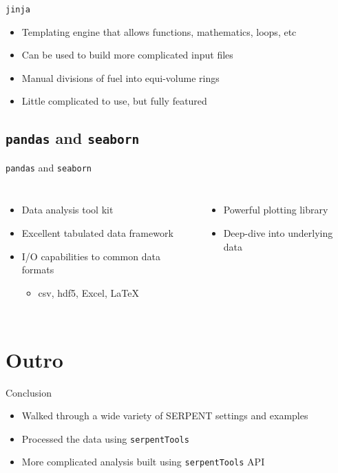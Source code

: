 \documentclass{beamer}
\newcommand{\st}{\texttt{serpentTools} }
\begin{document}
\begin{frame}{\texttt{jinja}}
    \begin{itemize}
        \item{Templating engine that allows functions, mathematics, loops, etc}
        \item{Can be used to build more complicated input files}
        \item{Manual divisions of fuel into equi-volume rings}
        \item{Little complicated to use, but fully featured}
    \end{itemize}
\end{frame}

\subsection{\texttt{pandas} and \texttt{seaborn}}

\begin{frame}{\texttt{pandas} and \texttt{seaborn}}
    \begin{columns}[t]
        \begin{itemize}
            \item{Data analysis tool kit}
            \item{Excellent tabulated data framework}
            \item{I/O capabilities to common data formats}
            \begin{itemize}
                \item{csv, hdf5, Excel, \LaTeX}
            \end{itemize}
        \end{itemize}
        \begin{itemize}
            \item{Powerful plotting library}
            \item{Deep-dive into underlying data}
        \end{itemize}
    \end{columns}
\end{frame}


\section*{Outro}

\begin{frame}{Conclusion}
    \begin{itemize}
        \item Walked through a wide variety of SERPENT settings and examples
        \item Processed the data using \st
        \item More complicated analysis built using \st API
    \end{itemize}
\end{frame}
\end{document}
